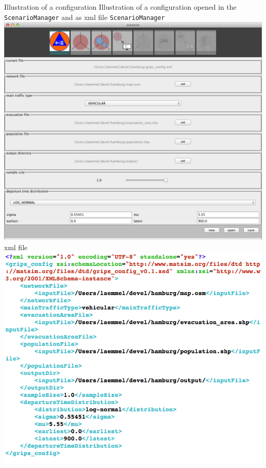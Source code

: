\createfigure%
{Illustration of a configuration}%
{Illustration of a configuration opened in the \lstinline|ScenarioManager| and as \gls{xml} file}%
{\label{chap:evac:fig:sc_man}}%
{%
  \createsubfigure%
  {\lstinline|ScenarioManager|}%
{\includegraphics[width=.475\linewidth]{extending/figures/Evacuation/grips_config}}
  {}%
  {}%
  \createsubfigure%
  {\gls{xml} file}%
{\includegraphics[width=.475\linewidth]{extending/figures/Evacuation/grips_config_xml}}
  {}%
  {}%
}%
  {}%

